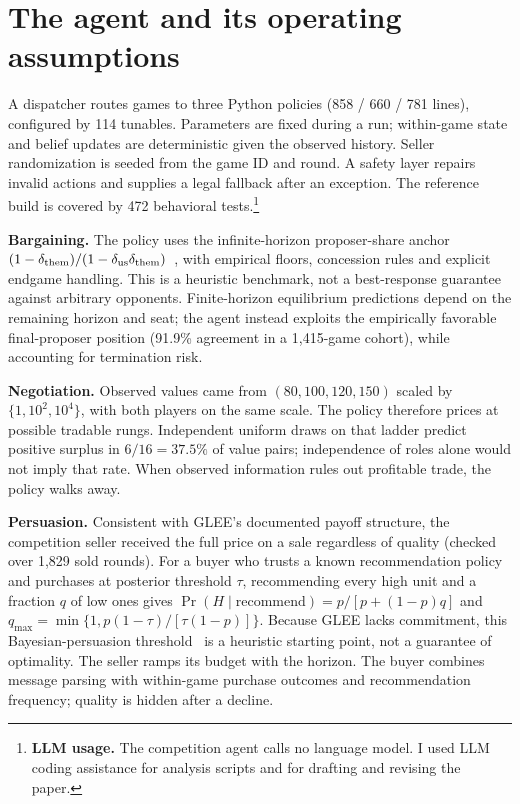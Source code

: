 \documentclass{article}
\begin{document}
\section{The agent and its operating assumptions}
A dispatcher routes games to three Python policies (858 / 660 / 781 lines),
configured by 114 tunables. Parameters are fixed during a run; within-game state
and belief updates are deterministic given the observed history. Seller
randomization is seeded from the game ID and round. A safety layer repairs
invalid actions and supplies a legal fallback after an exception. The reference
build is covered by 472 behavioral tests.\footnote{\textbf{LLM usage.} The competition
agent calls no language model. I used LLM coding assistance for analysis scripts
and for drafting and revising the paper.}

\textbf{Bargaining.} The policy uses the infinite-horizon proposer-share anchor
$(1-\delta_{\rm them})/(1-\delta_{\rm us}\delta_{\rm them})$~\cite{rubinstein1982},
with empirical floors, concession rules and explicit endgame handling. This is a
heuristic benchmark, not a best-response guarantee against arbitrary opponents.
Finite-horizon equilibrium predictions depend on the remaining horizon and seat;
the agent instead exploits the empirically favorable final-proposer position
(91.9\% agreement in a 1,415-game cohort), while accounting for termination risk.

\textbf{Negotiation.} Observed values came from $(80,100,120,150)$ scaled by
$\{1,10^2,10^4\}$, with both players on the same scale. The policy therefore
prices at possible tradable rungs. Independent uniform draws on that ladder
predict positive surplus in $6/16=37.5\%$ of value pairs; independence of roles
alone would not imply that rate. When observed information rules out profitable
trade, the policy walks away.

\textbf{Persuasion.} Consistent with GLEE's documented payoff structure, the
competition seller received the full price on a sale regardless of quality
(checked over 1,829 sold rounds). For a buyer who trusts a known recommendation
policy and purchases at posterior threshold $\tau$, recommending every high unit
and a fraction $q$ of low ones gives
$\Pr(H\mid\mathrm{recommend})=p/[p+(1-p)q]$ and
$q_{\max}=\min\{1,p(1-\tau)/[\tau(1-p)]\}$.
Because GLEE lacks commitment, this Bayesian-persuasion threshold~\cite{kamenica2011bayesian}
is a heuristic starting point, not a guarantee of optimality. The seller ramps its
budget with the horizon. The buyer combines message parsing with within-game
purchase outcomes and recommendation frequency; quality is hidden after a decline.
\end{document}
